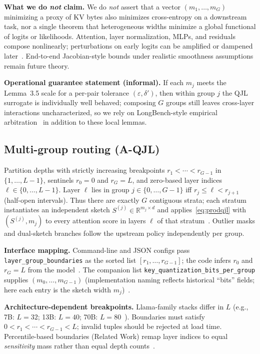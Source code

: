 \documentclass[conference]{IEEEtran}
\begin{document}
\textbf{What we do \emph{not} claim.}
We do \emph{not} assert that a vector $(m_1,\ldots,m_G)$ minimizing a proxy of KV bytes also minimizes cross-entropy on a downstream task, nor a single theorem that heterogeneous widths minimize a global functional of logits or likelihoods. Attention, layer normalization, MLPs, and residuals compose nonlinearly; perturbations on early logits can be amplified or dampened later~\cite{lipschitz2024}. End-to-end Jacobian-style bounds under realistic smoothness assumptions remain future theory.

\textbf{Operational guarantee statement (informal).}
If each $m_j$ meets the Lemma~3.5 scale for a per-pair tolerance $(\varepsilon,\delta')$, then within group $j$ the QJL surrogate is individually well behaved; composing $G$ groups still leaves cross-layer interactions uncharacterized, so we rely on LongBench-style empirical arbitration~\cite{bai2023longbench,presentation_mqjl} in addition to these local lemmas.

\subsection{Multi-group routing (A-QJL)}
\label{sec:aqjl}

Partition depths with strictly increasing breakpoints \(r_1<\cdots<r_{G-1}\) in \(\{1,\ldots,L-1\}\), sentinels \(r_0=0\) and \(r_G=L\), and zero-based layer indices \(\ell\in\{0,\ldots,L-1\}\). Layer \(\ell\) lies in group \(j\in\{0,\ldots,G-1\}\) iff \(r_j\le \ell < r_{j+1}\) (half-open intervals). Thus there are exactly \(G\) contiguous strata; each stratum instantiates an independent sketch \(S^{(j)}\in\mathbb{R}^{m_j\times d}\) and applies~\eqref{eq:prodqjl} with \((S^{(j)},m_j)\) to every attention score in layers \(\ell\) of that stratum~\cite{zandieh2024aqjl-repo}. Outlier masks and dual-sketch branches follow the upstream policy independently per group.

\textbf{Interface mapping.} Command-line and JSON configs pass \texttt{layer\_group\_boundaries} as the sorted list \([r_1,\ldots,r_{G-1}]\); the code infers \(r_0\) and \(r_G{=}L\) from the model~\cite{zandieh2024aqjl-repo}. The companion list \texttt{key\_quantization\_bits\_per\_group} supplies \((m_0,\ldots,m_{G-1})\) (implementation naming reflects historical ``bits'' fields; here each entry is the sketch width \(m_j\))~\cite{zandieh2024aqjl-repo,presentation_mqjl}.

\textbf{Architecture-dependent breakpoints.}
Llama-family stacks differ in $L$ (e.g., 7B: $L{=}32$; 13B: $L{=}40$; 70B: $L{=}80$~\cite{touvron2023llama}). Boundaries must satisfy \(0<r_1<\cdots<r_{G-1}<L\); invalid tuples should be rejected at load time. Percentile-based boundaries (Related Work) remap layer indices to equal \emph{sensitivity} mass rather than equal depth counts~\cite{presentation_mqjl}.
\end{document}
